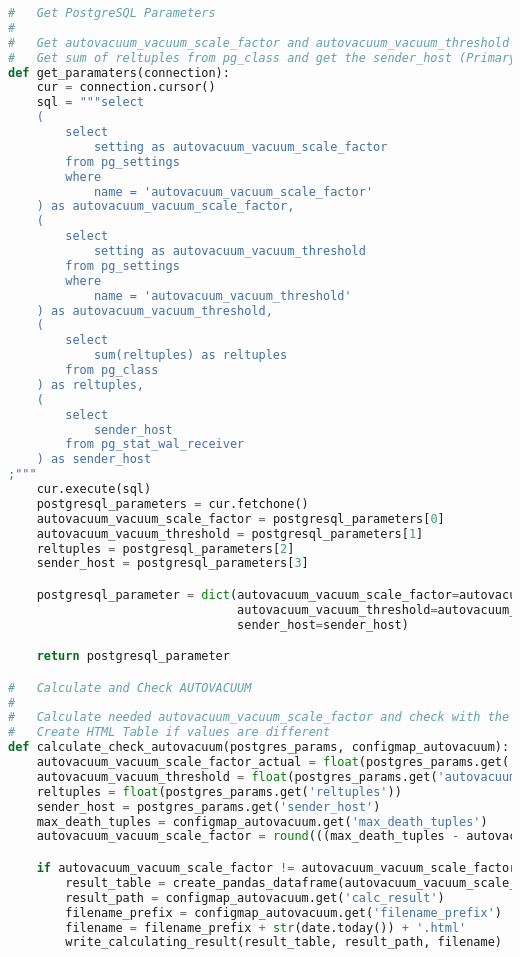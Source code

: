 \begin{flushleft}
\begin{lstlisting}[language=python, caption=Maintenance-Tool - \Gls{AUTOVACUUM} - ksgr\_postgresql\_maintenance\_autovacuum\_calculation.py,captionpos=b,label={lst:maintenannce-tool-autovacuum-python},breaklines=true]
#   Get PostgreSQL Parameters
#
#   Get autovacuum_vacuum_scale_factor and autovacuum_vacuum_threshold from pg_settings
#   Get sum of reltuples from pg_class and get the sender_host (Primary) IP Address from pg_stat_wal_receiver
def get_paramaters(connection):
    cur = connection.cursor()
    sql = """select
    (
        select
            setting as autovacuum_vacuum_scale_factor
        from pg_settings
        where
            name = 'autovacuum_vacuum_scale_factor'
    ) as autovacuum_vacuum_scale_factor,
    (
        select
            setting as autovacuum_vacuum_threshold
        from pg_settings
        where
            name = 'autovacuum_vacuum_threshold'
    ) as autovacuum_vacuum_threshold,
    (
        select
            sum(reltuples) as reltuples
        from pg_class
    ) as reltuples,
    (
        select
            sender_host
        from pg_stat_wal_receiver
    ) as sender_host
;"""
    cur.execute(sql)
    postgresql_parameters = cur.fetchone()
    autovacuum_vacuum_scale_factor = postgresql_parameters[0]
    autovacuum_vacuum_threshold = postgresql_parameters[1]
    reltuples = postgresql_parameters[2]
    sender_host = postgresql_parameters[3]

    postgresql_parameter = dict(autovacuum_vacuum_scale_factor=autovacuum_vacuum_scale_factor,
                                autovacuum_vacuum_threshold=autovacuum_vacuum_threshold, reltuples=reltuples,
                                sender_host=sender_host)

    return postgresql_parameter

#   Calculate and Check AUTOVACUUM
#
#   Calculate needed autovacuum_vacuum_scale_factor and check with the configured ones.
#   Create HTML Table if values are different
def calculate_check_autovacuum(postgres_params, configmap_autovacuum):
    autovacuum_vacuum_scale_factor_actual = float(postgres_params.get('autovacuum_vacuum_scale_factor'))
    autovacuum_vacuum_threshold = float(postgres_params.get('autovacuum_vacuum_threshold'))
    reltuples = float(postgres_params.get('reltuples'))
    sender_host = postgres_params.get('sender_host')
    max_death_tuples = configmap_autovacuum.get('max_death_tuples')
    autovacuum_vacuum_scale_factor = round(((max_death_tuples - autovacuum_vacuum_threshold) / reltuples), 2)

    if autovacuum_vacuum_scale_factor != autovacuum_vacuum_scale_factor_actual:
        result_table = create_pandas_dataframe(autovacuum_vacuum_scale_factor_actual, autovacuum_vacuum_scale_factor, ['autovacuum_vacuum_scale_factor'])
        result_path = configmap_autovacuum.get('calc_result')
        filename_prefix = configmap_autovacuum.get('filename_prefix')
        filename = filename_prefix + str(date.today()) + '.html'
        write_calculating_result(result_table, result_path, filename)


\end{lstlisting}
\end{flushleft}
